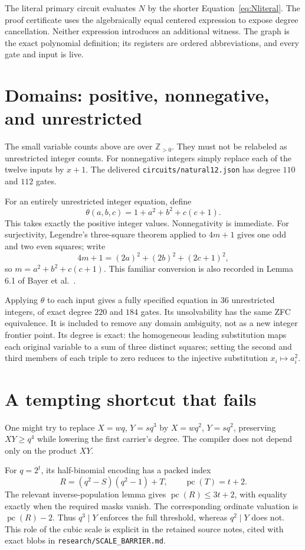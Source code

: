 \documentclass[11pt]{article}
\newcommand{\Zp}{\mathbb Z_{>0}}
\newcommand{\pc}{\operatorname{pc}}
\theoremstyle{remark}
\begin{document}
The literal primary circuit evaluates $N$ by the shorter
Equation~\eqref{eq:Nliteral}. The proof certificate uses the algebraically
equal centered expression to expose degree cancellation. Neither expression
introduces an additional witness. The graph is the exact polynomial
definition; its registers are ordered abbreviations, and every gate and
input is live.

\section{Domains: positive, nonnegative, and unrestricted}

The small variable counts above are over $\Zp$. They must not be relabeled
as unrestricted integer counts. For nonnegative integers simply replace
each of the twelve inputs by $x+1$. The delivered
\texttt{circuits/natural12.json} has degree $110$ and $112$ gates.

For an entirely unrestricted integer equation, define
\[
 \theta(a,b,c)=1+a^2+b^2+c(c+1).
\]
This takes exactly the positive integer values. Nonnegativity is immediate.
For surjectivity, Legendre's three-square theorem applied to $4m+1$
gives one odd and two even squares; write
\[
 4m+1=(2a)^2+(2b)^2+(2c+1)^2,
\]
so $m=a^2+b^2+c(c+1)$. This familiar conversion is also recorded in
Lemma 6.1 of Bayer et al.~\cite{bayer}.

Applying $\theta$ to each input gives a fully specified equation in $36$
unrestricted integers, of exact degree $220$ and $184$ gates. Its
unsolvability has the same ZFC equivalence. It is included to remove any
domain ambiguity, not as a new integer frontier point. Its degree is exact:
the homogeneous leading substitution maps each original variable to a sum
of three distinct squares; setting the second and third members of each
triple to zero reduces to the injective substitution $x_i\mapsto a_i^2$.

\section{A tempting shortcut that fails}
\label{sec:barrier}

One might try to replace $X=wq$, $Y=sq^3$ by $X=wq^2$, $Y=sq^2$,
preserving $XY\ge q^4$ while lowering the first carrier's degree. The
compiler does not depend only on the product $XY$.

For $q=2^t$, its half-binomial encoding has a packed index
\[
 R=(q^2-S)(q^2-1)+T,\qquad \pc(T)=t+2.
\]
The relevant inverse-population lemma gives $\pc(R)\le3t+2$,
with equality exactly when the required masks vanish. The corresponding
ordinate valuation is $\pc(R)-2$. Thus $q^3\mid Y$ enforces the full
threshold, whereas $q^2\mid Y$ does not. This role of the cubic scale is
explicit in the retained source notes, cited with exact blobs in
\texttt{research/SCALE\_BARRIER.md}.
\end{document}
